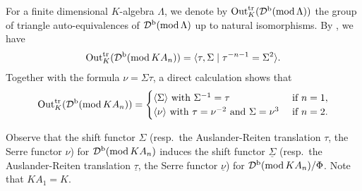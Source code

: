 \documentclass[12pt]{amsart}
\numberwithin{equation}{subsection}
\theoremstyle{plain}
\theoremstyle{definition}
\renewcommand{\mod}{\mathrm{mod}\,}
\renewcommand{\L}{\Lambda}
\newcommand{\D}{\mathcal{D}}
\newcommand{\Out}{\mathrm{Out}^{\rm tr}_K}
\begin{document}
For a finite dimensional $K$-algebra $\L$, we denote by $\Out(\D^{\rm b}(\mod \L))$ the group of triangle auto-equivalences of $\D^{\rm b}(\mod \L)$ up to natural isomorphisms.
By \cite[Corollary 1.9 and Theorem 4.1]{Miyachi-Yekutieli_2001}, we have 
\begin{align}
    \Out(\D^{\rm b}(\mod KA_n)) =\langle\tau, \Sigma\mid \tau^{-n-1}= \Sigma^2\rangle.
\end{align}
Together with the formula $\nu=\Sigma\tau$, a direct calculation shows that 
\begin{align}
\Out(\D^{\rm b}(\mod KA_n)) =
\begin{cases}
    \langle\Sigma\rangle \text{ with } \Sigma^{-1}=\tau & \text{ if $n=1$},\\[0mm]
    \langle\nu\rangle \text{ with $\tau=\nu^{-2}$ and $\Sigma=\nu^3$}  & \text{ if $n=2$}.
\end{cases}
\end{align}

Observe that the shift functor $\Sigma$ (resp.~the Auslander-Reiten translation $\tau$, the Serre functor $\nu$) for $\D^{\rm b}(\mod KA_n)$ induces the shift functor $\underline{\Sigma}$ (resp.~the Auslander-Reiten translation $\underline{\tau}$, the Serre functor $\underline{\nu}$) for $\D^{\rm b}(\mod KA_n)/\Phi$.
Note that $KA_1=K$.
\end{document}
